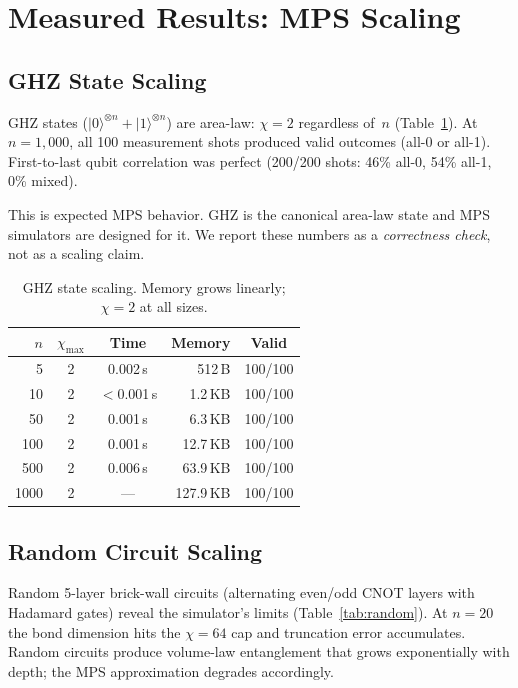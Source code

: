 \documentclass{article}
\begin{document}
\section{Measured Results: MPS Scaling}
\label{sec:scaling}

\subsection{GHZ State Scaling}

GHZ states ($\lvert 0\rangle^{\otimes n}+\lvert 1\rangle^{\otimes n}$) are area-law: $\chi=2$ regardless of~$n$ (Table~\ref{tab:ghz}).  At $n=1{,}000$, all 100 measurement shots produced valid outcomes (all-0 or all-1).  First-to-last qubit correlation was perfect (200/200 shots: 46\% all-0, 54\% all-1, 0\% mixed).

This is expected MPS behavior.  GHZ is the canonical area-law state and MPS simulators are designed for it.  We report these numbers as a \emph{correctness check}, not as a scaling claim.

\begin{table}[h]
  \caption{GHZ state scaling.  Memory grows linearly; $\chi=2$ at all sizes.}
  \label{tab:ghz}
  \centering
  \begin{tabular}{rccrc}
    \toprule
    $n$ & $\chi_{\max}$ & Time & Memory & Valid \\
    \midrule
       5 & 2 & 0.002\,s &   512\,B & 100/100 \\
      10 & 2 & $<$0.001\,s & 1.2\,KB & 100/100 \\
      50 & 2 & 0.001\,s &  6.3\,KB & 100/100 \\
     100 & 2 & 0.001\,s & 12.7\,KB & 100/100 \\
     500 & 2 & 0.006\,s & 63.9\,KB & 100/100 \\
    1000 & 2 & ---       &127.9\,KB & 100/100 \\
    \bottomrule
  \end{tabular}
\end{table}

\subsection{Random Circuit Scaling}

Random 5-layer brick-wall circuits (alternating even/odd CNOT layers with Hadamard gates) reveal the simulator's limits (Table~\ref{tab:random}).  At $n=20$ the bond dimension hits the $\chi=64$ cap and truncation error accumulates.  Random circuits produce volume-law entanglement that grows exponentially with depth; the MPS approximation degrades accordingly.
\end{document}
